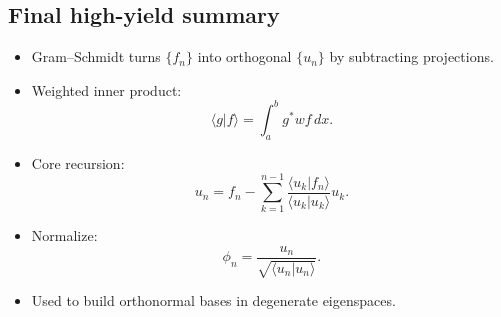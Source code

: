 
\subsection{Final high-yield summary}
\begin{itemize}
\item Gram--Schmidt turns $\{f_n\}$ into orthogonal $\{u_n\}$ by subtracting projections.
\item Weighted inner product:
\[
\langle g|f\rangle = \int_a^b g^*wf\,dx.
\]
\item Core recursion:
\[
u_n = f_n - \sum_{k=1}^{n-1}\frac{\langle u_k|f_n\rangle}{\langle u_k|u_k\rangle}u_k.
\]
\item Normalize:
\[
\phi_n = \frac{u_n}{\sqrt{\langle u_n|u_n\rangle}}.
\]
\item Used to build orthonormal bases in degenerate eigenspaces.
\end{itemize}
